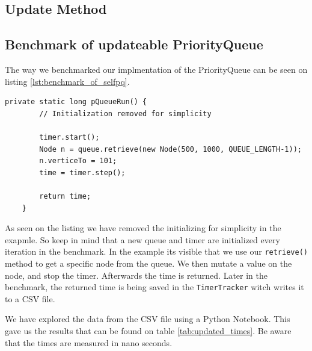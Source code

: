\documentclass{article}
\begin{document}
\subsection{Update Method} %
\subsection{Benchmark of updateable PriorityQueue} %
The way we benchmarked our implmentation of the PriorityQueue can be seen on listing \ref{lst:benchmark_of_selfpq}.

\begin{lstlisting}[caption={Benchmark implmentation on our PriorityQueue},label={lst:benchmark_of_selfpq}]
    private static long pQueueRun() {
        // Initialization removed for simplicity

        timer.start();
        Node n = queue.retrieve(new Node(500, 1000, QUEUE_LENGTH-1));
        n.verticeTo = 101;
        time = timer.step();

        return time;
    }
\end{lstlisting}

As seen on the listing we have removed the initializing for simplicity in the exapmle. 
So keep in mind that a new queue and timer are initialized every iteration in the benchmark. 
In the example its visible that we use our \lstinline{retrieve()} method to get a specific 
node from the queue. We then mutate a value on the node, and stop the timer. 
Afterwards the time is returned. Later in the benchmark, the returned time is being saved in the
\lstinline{TimerTracker} witch writes it to a CSV file. 

We have explored the data from the CSV file using a Python Notebook. This gave us the 
results that can be found on table \ref{tab:updated_times}. Be aware that the times are measured in nano seconds. 
\end{document}
